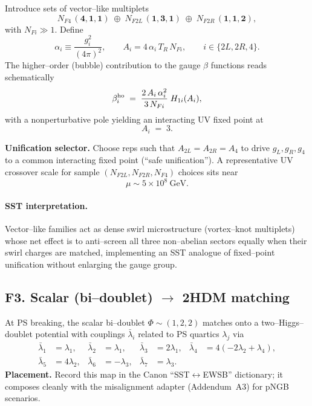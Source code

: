 \documentclass[11pt]{article}
\begin{document}
          Introduce sets of vector–like multiplets
          \[
              N_{F4}\,(\mathbf 4,\mathbf 1,\mathbf 1)\;\oplus\;
              N_{F2L}\,(\mathbf 1,\mathbf 3,\mathbf 1)\;\oplus\;
              N_{F2R}\,(\mathbf 1,\mathbf 1,\mathbf 2),
          \]
          with $N_{Fi}\!\gg\!1$.
          Define
          \begin{equation}
          \alpha_i \equiv \frac{g_i^2}{(4\pi)^2},\qquad
          A_i = 4\,\alpha_i\,T_R\,N_{Fi},\qquad i\in\{2L,2R,4\}.
          \end{equation}
          The higher–order (bubble) contribution to the gauge $\beta$ functions reads schematically
          \begin{equation}
          \beta_i^{\rm ho} \;=\; \frac{2\,A_i\,\alpha_i^2}{3\,N_{Fi}}\;H_{1i}(A_i),
          \end{equation}
          with a nonperturbative pole yielding an interacting UV fixed point at
          \begin{equation}
          A_i \;=\; 3.
          \end{equation}

          \textbf{Unification selector.} \; Choose reps such that $A_{2L}=A_{2R}=A_4$ to drive $g_L,g_R,g_4$ to a common interacting fixed point (“safe unification”). A representative UV crossover scale for sample $(N_{F2L},N_{F2R},N_{F4})$ choices sits near
          \[
              \mu \sim 5\times10^{8}\ \mathrm{GeV}.
          \]

          \paragraph{SST interpretation.}
              Vector–like families act as dense swirl microstructure (vortex–knot multiplets) whose net effect is to anti–screen all three non–abelian sectors equally when their swirl charges are matched, implementing an SST analogue of fixed–point unification without enlarging the gauge group.

  \subsection*{F3. Scalar (bi–doublet) $\to$ 2HDM matching}

      At PS breaking, the scalar bi–doublet $\Phi\sim(1,2,2)$ matches onto a two–Higgs–doublet potential with couplings $\bar\lambda_i$ related to PS quartics $\lambda_j$ via
      \begin{align}
      \bar\lambda_1&=\lambda_1, & \bar\lambda_2&=\lambda_1, &
      \bar\lambda_3&=2\lambda_1, & \bar\lambda_4&=4(-2\lambda_2+\lambda_4),\\
      \bar\lambda_5&=4\lambda_2, & \bar\lambda_6&=-\lambda_3, &
      \bar\lambda_7&=\lambda_3. &&
      \end{align}
      \textbf{Placement.} Record this map in the Canon “SST$\leftrightarrow$EWSB” dictionary; it composes cleanly with the misalignment adapter (Addendum~A3) for pNGB scenarios.
\end{document}
